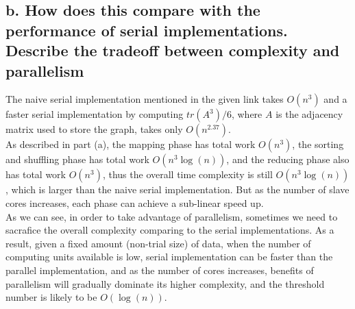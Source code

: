 \documentclass[11 pt, a4paper]{article}  %
\begin{document}
\subsection*{b. How does this compare with the performance of serial implementations. Describe the tradeoff between complexity and parallelism}

The naive serial implementation mentioned in the given link takes $O(n^3)$ and a faster serial implementation by computing $tr(A^3)/6$, where $A$ is the adjacency matrix used to store the graph, takes only $O(n^{2.37})$. \\

As described in part (a), the mapping phase has total work $O(n^3)$, the sorting and shuffling phase has total work $O(n^3\log(n))$, and the reducing phase also has total work $O(n^3)$, thus the overall time complexity is still $O(n^3\log(n))$, which is larger than the naive serial implementation. But as the number of slave cores increases, each phase can achieve a sub-linear speed up.\\

As we can see, in order to take advantage of parallelism, sometimes we need to sacrafice the overall complexity comparing to the serial implementations. As a result, given a fixed amount (non-trial size) of data, when the number of computing units available is low, serial implementation can be faster than the parallel implementation, and as the number of cores increases, benefits of parallelism will gradually dominate its higher complexity, and the threshold number is likely to be $O(\log(n))$. 
\end{document}

